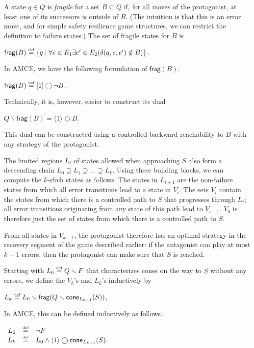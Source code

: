 \documentclass[times,10pt,twocolumn]{article}
\newcommand\cla{\mathsf{cone}}
\newcommand\frag{\mathsf{frag}}
\newcommand{\defn}{\stackrel{\mbox{\tiny def}}{=}}
\newcommand{\nxt}{\bigcirc}
\begin{document}
A state $q\in Q$ is \emph{fragile} for a set $B\subseteq Q$ 
if, for all moves of the protagonist, at least one of its successors is outside of $B$.
(The intuition is that this is an error move, and for simple safety resilience game structures, we can restrict the definition to failure states.)
The set of fragile states for $B$ is 
\begin{center} 
$\frag(B) \defn 
\{q\mid \forall e\in E_1 \exists e'\in E_2(\delta(q,e,e')\notin B)\}$.
\end{center} 
In AMCE, we have the following formulation of $\frag(B)$.  
\begin{center} 
$\frag(B)\defn [ 1 ] \nxt \neg B$.  
\end{center} 
Technically, it is, however, easier to construct its dual
\begin{center} 
\label{reply2.easier.frag.B} 
$Q \smallsetminus \frag(B) = \langle 1 \rangle \nxt B$. 
\end{center} 
This dual can be constructed using a controlled backward reachability to $B$ with 
any strategy of the protagonist.   


The limited regions $L_i$ of states allowed when approaching 
$S$ also form a descending chain 
$L_0 \supseteq L_1 \supseteq \ldots \supseteq L_k$.
%
Using these building blocks, we can compute the $k$-sfrch states 
as follows. 
The states in $L_{i+1}$ are the non-failure states from which all 
error transitions lead to a state in $V_i$.
The sets $V_i$ contain the states from which there is a
controlled path to $S$ that progresses through $L_i$; 
all error transitions originating from any state 
of this path lead to $V_{i-1}$.
$V_0$ is therefore just the set of states from 
which there is a controlled path to $S$.

From all states in $V_{k-1}$, the protagonist 
therefore has an optimal strategy in the recovery segment  
of the game described earlier:
if the antagonist can play at most $k-1$ errors, 
then the protagonist can make sure that $S$ is reached.

Starting with $L_0 \defn Q \smallsetminus F$ that 
characterizes cones on the way to $S$ 
without any errors, 
we define the $V_k$'s and $L_k$'s inductively by
\begin{center} 
$L_k\defn L_0 \smallsetminus \frag(Q\smallsetminus \cla_{L_{k-1}}(S))$,
\end{center}

In AMCE, this can be defined inductively as follows. 
\begin{center} 
$\begin{array}{rcl} 
L_0   & \defn & \neg F \\
L_k   & \defn & L_0 \wedge \langle 1 \rangle \nxt \cla_{L_{k-1}}(S).\\
\end{array}$
\end{center} 
\end{document}
